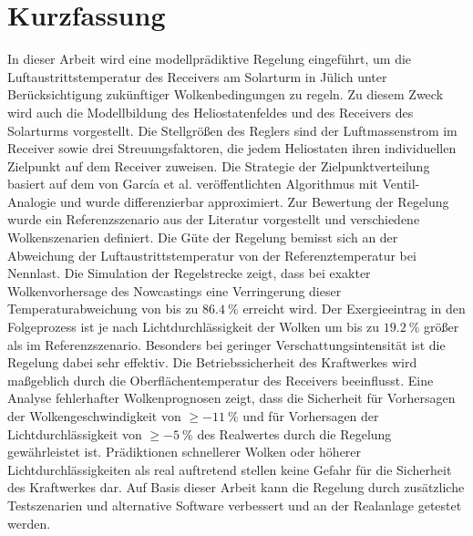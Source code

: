 \chapter*{Kurzfassung}
In dieser Arbeit wird eine modellprädiktive Regelung eingeführt, um die Luftaustrittstemperatur des Receivers am Solarturm in Jülich unter Berücksichtigung zukünftiger Wolkenbedingungen zu regeln.
Zu diesem Zweck wird auch die Modellbildung des Heliostatenfeldes und des Receivers des Solarturms vorgestellt.
Die Stellgrößen des Reglers sind der Luftmassenstrom im Receiver sowie drei Streuungsfaktoren, die jedem Heliostaten ihren individuellen Zielpunkt auf dem Receiver zuweisen.
Die Strategie der Zielpunktverteilung basiert auf dem von García et al. veröffentlichten Algorithmus mit Ventil-Analogie \cite{Garcia2} und wurde differenzierbar approximiert.
Zur Bewertung der Regelung wurde ein Referenzszenario aus der Literatur vorgestellt und verschiedene Wolkenszenarien definiert.
Die Güte der Regelung bemisst sich an der Abweichung der Luftaustrittstemperatur von der Referenztemperatur bei Nennlast.
Die Simulation der Regelstrecke zeigt, dass bei exakter Wolkenvorhersage des Nowcastings eine Verringerung dieser Temperaturabweichung von bis zu $\SI{86.4}{\percent}$ erreicht wird.
Der Exergieeintrag in den Folgeprozess ist je nach Lichtdurchlässigkeit der Wolken um bis zu $\SI{19.2}{\percent}$ größer als im Referenzszenario.
Besonders bei geringer Verschattungsintensität ist die Regelung dabei sehr effektiv.
Die Betriebssicherheit des Kraftwerkes wird maßgeblich durch die Oberflächentemperatur des Receivers beeinflusst.
Eine Analyse fehlerhafter Wolkenprognosen zeigt, dass die Sicherheit für Vorhersagen der Wolkengeschwindigkeit von $\geq\SI{-11}{\percent}$ und für Vorhersagen der Lichtdurchlässigkeit von $\geq\SI{-5}{\percent}$ des Realwertes durch die Regelung gewährleistet ist.
Prädiktionen schnellerer Wolken oder höherer Lichtdurchlässigkeiten als real auftretend stellen keine Gefahr für die Sicherheit des Kraftwerkes dar.
Auf Basis dieser Arbeit kann die Regelung durch zusätzliche Testszenarien und alternative Software verbessert und an der Realanlage getestet werden.

